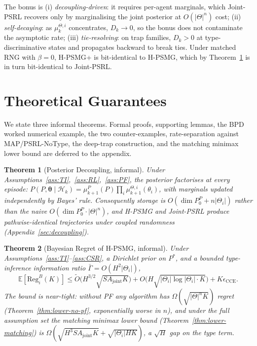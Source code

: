 ﻿\documentclass{article}
\newtheorem{theorem}{Theorem}[section]
\def\textsuperscript#1{#1}%
\begin{document}
The bonus is (i) \emph{decoupling-driven}: it requires per-agent marginals, which Joint-PSRL recovers only by marginalising the joint posterior at $O(|\Theta|^n)$ cost; (ii) \emph{self-decaying}: as $\mu_k^{\Theta,i}$ concentrates, $D_k\!\to\!0$, so the bonus does not contaminate the asymptotic rate; (iii) \emph{tie-resolving}: on trap families, $D_k>0$ at type-discriminative states and propagates backward to break ties. Under matched RNG with $\beta=0$, H-PSMG\textsuperscript{+} is bit-identical to H-PSMG, which by Theorem~\ref{thm:decoupling} is in turn bit-identical to Joint-PSRL.

\section{Theoretical Guarantees}
\label{sec:theory}

We state three informal theorems. Formal proofs, supporting lemmas, the BPD worked numerical example, the two counter-examples, rate-separation against MAP/PSRL-NoType, the deep-trap construction, and the matching minimax lower bound are deferred to the appendix.

\begin{theorem}[Posterior Decoupling, informal]\label{thm:decoupling}
Under Assumptions~\ref{ass:TI},~\ref{ass:RL},~\ref{ass:PF}, the posterior factorises at every episode:
$P(P,\boldsymbol\theta\!\mid\!\mathcal H_k)=\mu_{k+1}^P(P)\prod_{i}\mu_{k+1}^{\Theta,i}(\theta_i)$,
with marginals updated independently by Bayes' rule. Consequently storage is $O(\dim P_0^P + n|\Theta_i|)$ rather than the naive $O(\dim P_0^P\cdot|\Theta|^n)$, and H-PSMG and Joint-PSRL produce pathwise-identical trajectories under coupled randomness (Appendix~\ref{sec:decoupling}).
\end{theorem}

\begin{theorem}[Bayesian Regret of H-PSMG, informal]\label{thm:main-regret-informal}
Under Assumptions~\ref{ass:TI}--\ref{ass:CSR}, a Dirichlet prior on $P^*$, and a bounded type-inference information ratio $\bar\Gamma = O(H^2|\Theta_i|)$,
\begin{equation*}
\mathbb{E}[\mathrm{Reg}_i^B(K)] \leq \tilde O\!\big(H^{3/2}\sqrt{S A_{\mathrm{joint}} K}\big) + O\!\big(H\sqrt{|\Theta_i|\log|\Theta_i|\cdot K}\big) + K\epsilon_{\mathrm{CCE}}.
\end{equation*}
The bound is near-tight: without PF any algorithm has $\Omega(\sqrt{|\Theta|^n K})$ regret (Theorem~\ref{thm:lower-no-pf}, exponentially worse in $n$), and under the full assumption set the matching minimax lower bound (Theorem~\ref{thm:lower-matching}) is $\Omega(\sqrt{H^3 S A_{\mathrm{joint}} K}+\sqrt{|\Theta_i| H K})$, a $\sqrt H$ gap on the type term.
\end{theorem}
\end{document}
